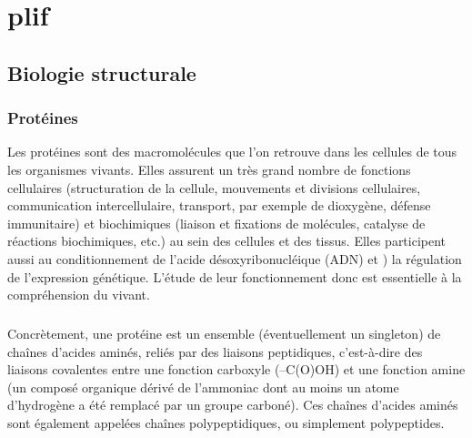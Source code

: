 
\chapter[Contexte/Besoin/Applications]{plif}
\minitoc
\label{chap1}
\cleardoublepage

	\section{Biologie structurale}
	\subsection{Protéines}
	Les protéines sont des macromolécules que l'on retrouve dans les cellules de tous les organismes vivants. Elles assurent un très grand nombre de fonctions cellulaires (structuration de la cellule, mouvements et divisions cellulaires, communication intercellulaire, transport, par exemple de dioxygène, défense immunitaire) et biochimiques (liaison et fixations de molécules, catalyse de réactions biochimiques, etc.) au sein des cellules et des tissus. Elles participent aussi au conditionnement de l'acide désoxyribonucléique (ADN) et ) la régulation de l'expression génétique. L'étude de leur fonctionnement donc est essentielle à la compréhension du vivant.
	
	\paragraph{}
	Concrètement, une protéine est un ensemble (éventuellement un singleton) de chaînes d'acides aminés, reliés par des liaisons peptidiques, c'est-à-dire des liaisons covalentes entre une fonction carboxyle (–C(O)OH) et une fonction amine (un composé organique dérivé de l'ammoniac dont au moins un atome d'hydrogène a été remplacé par un groupe carboné). Ces chaînes d'acides aminés sont également appelées chaînes polypeptidiques, ou simplement polypeptides.
	
